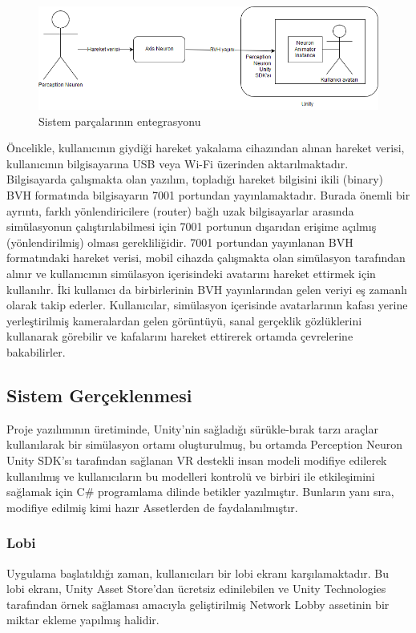 \documentclass[a4paper, 12pt, titlepage]{article}
\begin{document}
\begin{figure}[ht!]
    \centering
        \includegraphics[width=6in]{images/ent}
    \caption{Sistem parçalarının entegrasyonu}
    \label{ent}
\end{figure}

Öncelikle, kullanıcının giydiği hareket yakalama cihazından alınan hareket
verisi, kullanıcının bilgisayarına USB veya Wi-Fi üzerinden
aktarılmaktadır. Bilgisayarda çalışmakta olan yazılım, topladığı hareket bilgisini ikili (binary) BVH formatında bilgisayarın
7001 portundan yayınlamaktadır. Burada önemli bir ayrıntı, farklı yönlendiricilere (router) bağlı
uzak bilgisayarlar arasında simülasyonun çalıştırılabilmesi için 7001 portunun dışarıdan erişime
açılmış (yönlendirilmiş) olması gerekliliğidir. 7001 portundan yayınlanan BVH formatındaki hareket
verisi, mobil cihazda çalışmakta olan simülasyon tarafından alınır ve
kullanıcının simülasyon içerisindeki avatarını hareket ettirmek için kullanılır. İki kullanıcı da
birbirlerinin BVH yayınlarından gelen veriyi eş zamanlı olarak takip ederler. Kullanıcılar,
simülasyon içerisinde avatarlarının kafası yerine yerleştirilmiş kameralardan gelen görüntüyü,
sanal gerçeklik gözlüklerini kullanarak görebilir ve kafalarını hareket ettirerek ortamda
çevrelerine bakabilirler.

\subsection{Sistem Gerçeklenmesi}

Proje yazılımının üretiminde, Unity’nin sağladığı sürükle-bırak tarzı araçlar kullanılarak bir
simülasyon ortamı oluşturulmuş, bu ortamda Perception Neuron Unity SDK’sı tarafından sağlanan VR
destekli insan modeli modifiye edilerek kullanılmış ve kullanıcıların bu modelleri kontrolü ve
birbiri ile etkileşimini sağlamak için C\# programlama dilinde betikler yazılmıştır. Bunların yanı
sıra, modifiye edilmiş kimi hazır Assetlerden de faydalanılmıştır.

\subsubsection{Lobi}
Uygulama başlatıldığı zaman, kullanıcıları bir lobi ekranı karşılamaktadır. Bu lobi ekranı, Unity
Asset Store’dan ücretsiz edinilebilen ve Unity Technologies tarafından örnek sağlaması amacıyla
geliştirilmiş Network Lobby assetinin bir miktar ekleme yapılmış halidir.
\end{document}
